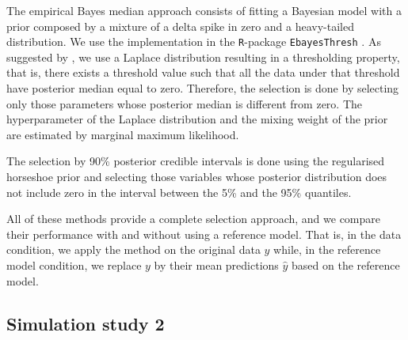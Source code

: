 \documentclass[a4]{article}
\theoremstyle{definition}
\begin{document}
The empirical Bayes median approach consists of fitting a Bayesian
model with a prior composed by a mixture of a delta spike in zero and
a heavy-tailed distribution. We use the implementation in the
\texttt{R}-package \texttt{EbayesThresh}
\citep{Silverman+etal:2017:EbayesThresh}. As suggested by
\cite{johnstone2004needles}, we use a Laplace distribution resulting
in a thresholding property, that is, there exists a threshold value
such that all the data under that threshold have posterior median
equal to zero. Therefore, the selection is done by selecting only those
parameters whose posterior median is different from zero. The
hyperparameter of the Laplace distribution and the mixing weight of
the prior are estimated by marginal maximum likelihood.

The selection
by 90\% posterior credible intervals is done using the regularised
horseshoe prior  and selecting those variables whose posterior
distribution does not include zero in the interval between the 5\% and
the 95\% quantiles.

All of these methods provide a complete selection approach, and we
compare their performance with and without using a reference model.
That is, in the data condition, we apply the method on the original
data $y$ while, in the reference model condition, we replace $y$ by
their mean predictions $\hat{y}$ based on the reference model.
  

\subsection{Simulation study 2}
\label{simulations}
\end{document}
